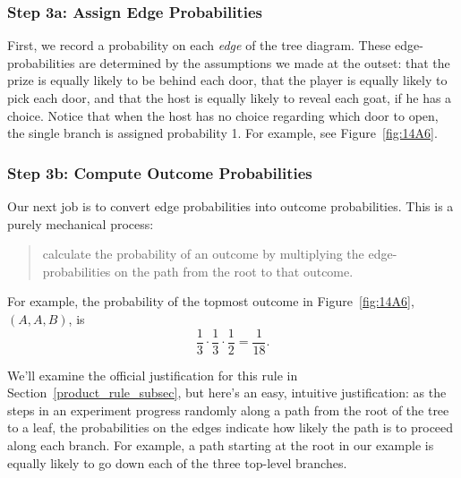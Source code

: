 \subsubsection{Step 3a: Assign Edge Probabilities}

First, we record a probability on each \emph{edge} of the tree
diagram.  These edge-probabilities are determined by the assumptions
we made at the outset: that the prize is equally likely to be behind
each door, that the player is equally likely to pick each door, and
that the host is equally likely to reveal each goat, if he has a
choice.  Notice that when the host has no choice regarding which door
to open, the single branch is assigned probability 1.  For example,
see Figure~\ref{fig:14A6}.
\iffalse

\begin{figure}

\graphic{Monty5}

\caption{The tree diagram for the Monty Hall Problem where edge
  weights denote the probability of that branch being taken, given that
  we are at the parent of that branch.  For example, if the car is
  behind door~$A$, then there is a 1/3~chance that the player's
  initial selection is door~$B$.}

\label{fig:14A5}

\end{figure}
\fi

\subsubsection{Step 3b: Compute Outcome Probabilities}

Our next job is to convert edge probabilities into outcome
probabilities.  This is a purely mechanical process:
\begin{quote}
calculate the probability of an outcome by multiplying the
edge-probabilities on the path from the root to that outcome.
\end{quote}
For example, the probability of the topmost outcome in
Figure~\ref{fig:14A6}, $(A, A, B)$, is
\begin{equation}\label{131312118}
\frac{1}{3} \cdot \frac{1}{3} \cdot \frac{1}{2} = \frac{1}{18}.
\end{equation}

We'll examine the official justification for this rule in
Section~\ref{product_rule_subsec}, but here's an easy, intuitive
justification: as the steps in an experiment progress randomly along a
path from the root of the tree to a leaf, the probabilities on the
edges indicate how likely the path is to proceed along each branch.
For example, a path starting at the root in our example is equally
likely to go down each of the three top-level branches.

